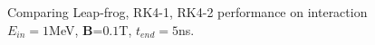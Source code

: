 \documentclass[a4paper,oneside,12pt]{report}
\numberwithin{equation}{chapter}
\begin{document}
\begin{figure}[H]
    \centering
    \vspace{20pt}
    \vspace{20pt}
    \caption{\centering Comparing Leap-frog, RK4-1, RK4-2 performance on \eB interaction $E_{in}=1$MeV, \textbf{B}=$0.1$T, $t_{end}=5$ns.} 
    \label{fig:lf_rk1_rk2_comparison}
\end{figure}
\end{document}
